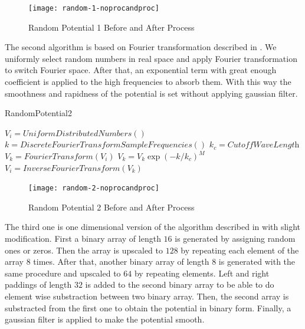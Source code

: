 \documentclass[a4paper,times,hidelinks,12pt]{article}
\begin{document}
\graphicspath{{"../figs/potentials/"}}
\begin{figure}[H]
    \centering
        \texttt{[image: random-1-noprocandproc]}
\caption{Random Potential 1 Before and After Process}
\label{fig:random1_before_after}
\end{figure}

The second algorithm is based on Fourier transformation described in \cite{akkermans2008numerical}. We uniformly select random numbers in real space and apply Fourier transformation to switch Fourier space. After that, an exponential term with great enough coefficient is applied to the high frequencies to absorb them. With this way the smoothness and rapidness of the potential is set without applying gaussian filter.

\begin{algorithm}[H]
    \caption{RandomPotential2}\label{euclid}
    \begin{algorithmic}[1]
        \State $V_i = UniformDistributedNumbers()$
        \State $k = DiscreteFourierTransformSampleFrequencies()$
        \State $k_c = \textit{CutoffWaveLength}$
        \State $V_k = FourierTransform(V_i)$
        \State $V_k = V_k \exp(-k/k_c)^M$
        \State $V_i = InverseFourierTransform(V_k)$
    \EndProcedure
    \end{algorithmic}
\label{alg:random_potential_1}
\end{algorithm}

\graphicspath{{"../figs/potentials/"}}
\begin{figure}[H]
    \centering
        \texttt{[image: random-2-noprocandproc]}
\caption{Random Potential 2 Before and After Process}
\label{fig:random2_before_after}
\end{figure}

The third one is one dimensional version of the algorithm described in \cite{mills2017deep} with slight modification. First a binary array of length $16$ is generated by assigning random ones or zeros. Then the array is upscaled to $128$ by repeating each element of the array $8$ times. After that, another binary array of length $8$ is generated with the same procedure and upscaled to $64$ by repeating elements. Left and right paddings of length $32$ is added to the second binary array to be able to do element wise substraction between two binary array. Then, the second array is substracted from the first one to obtain the potential in binary form. Finally, a gaussian filter is applied to make the potential smooth. 
\end{document}
